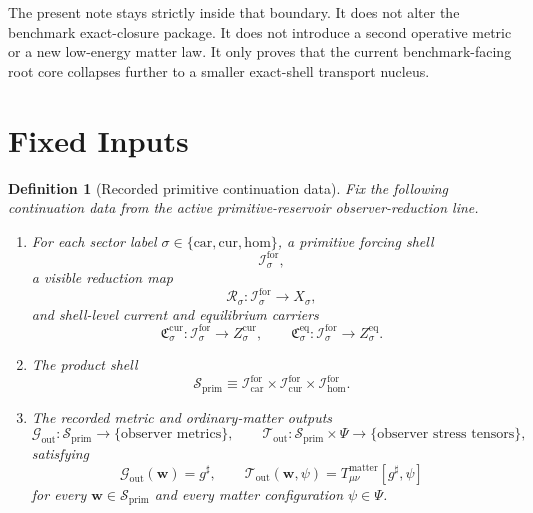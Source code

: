 \documentclass[11pt]{article}
\newcommand{\CompletedMetric}{g^{\sharp}}
\newcommand{\MatterSpace}{\Psi}
\newcommand{\Car}{\mathrm{car}}
\newcommand{\Cur}{\mathrm{cur}}
\newcommand{\Hom}{\mathrm{hom}}
\newcommand{\ForSpace}[1]{\mathcal I_{#1}^{\mathrm{for}}}
\newcommand{\PrimShell}{\mathcal S_{\mathrm{prim}}}
\newcommand{\Reduction}[1]{\mathcal R_{#1}}
\newcommand{\CurrentCarrier}[1]{\mathfrak C_{#1}^{\mathrm{cur}}}
\newcommand{\EqCarrier}[1]{\mathfrak C_{#1}^{\mathrm{eq}}}
\newcommand{\MetricOut}{\mathscr G_{\mathrm{out}}}
\newcommand{\MatterOut}{\mathscr T_{\mathrm{out}}}
\newtheorem{definition}{Definition}
\begin{document}
The present note stays strictly inside that boundary. It does not alter the benchmark exact-closure package. It does not introduce a second operative metric or a new low-energy matter law. It only proves that the current benchmark-facing root core collapses further to a smaller exact-shell transport nucleus.

\section{Fixed Inputs}

\begin{definition}[Recorded primitive continuation data]
\label{def:fixed}
Fix the following continuation data from the active primitive-reservoir observer-reduction line.
\begin{enumerate}
    \item For each sector label \(\sigma\in\{\Car,\Cur,\Hom\}\), a primitive forcing shell
    \[
    \ForSpace{\sigma},
    \]
    a visible reduction map
    \[
    \Reduction{\sigma}:\ForSpace{\sigma}\to X_{\sigma},
    \]
    and shell-level current and equilibrium carriers
    \[
    \CurrentCarrier{\sigma}:\ForSpace{\sigma}\to Z_{\sigma}^{\mathrm{cur}},
    \qquad
    \EqCarrier{\sigma}:\ForSpace{\sigma}\to Z_{\sigma}^{\mathrm{eq}}.
    \]
    \item The product shell
    \[
    \PrimShell
    \equiv
    \ForSpace{\Car}\times \ForSpace{\Cur}\times \ForSpace{\Hom}.
    \]
    \item The recorded metric and ordinary-matter outputs
    \[
    \MetricOut:\PrimShell\to\{\text{observer metrics}\},
    \qquad
    \MatterOut:\PrimShell\times\MatterSpace\to\{\text{observer stress tensors}\},
    \]
    satisfying
    \begin{equation}
    \MetricOut(\mathbf w)=\CompletedMetric,
    \qquad
    \MatterOut(\mathbf w,\psi)
    =
    T_{\mu\nu}^{\mathrm{matter}}[\CompletedMetric,\psi]
    \label{eq:fixedoutputs}
    \end{equation}
    for every \(\mathbf w\in\PrimShell\) and every matter configuration \(\psi\in\MatterSpace\).
\end{enumerate}
\end{definition}
\end{document}
